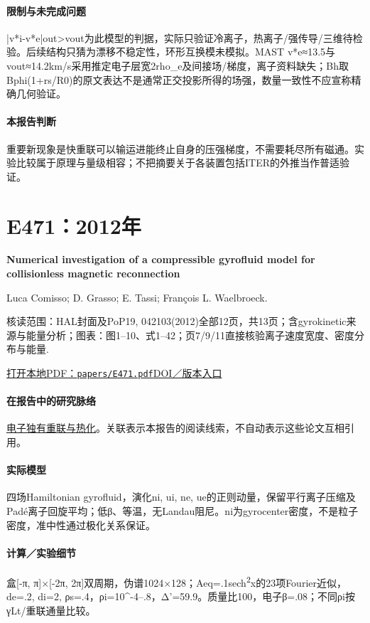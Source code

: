 \paragraph{限制与未完成问题}|v*i-v*e|out>vout为此模型的判据，实际只验证冷离子，热离子/强传导/三维待检验。后续结构只猜为漂移不稳定性，环形互换模未模拟。MAST v*e≈13.5与vout≈14.2km/s采用推定电子层宽2rho\_e及间接场/梯度，离子资料缺失；Bh取Bphi(1+rs/R0)的原文表达不是通常正交投影所得的场强，数量一致性不应宣称精确几何验证。

\paragraph{本报告判断}重要新现象是快重联可以输运进能终止自身的压强梯度，不需要耗尽所有磁通。实验比较属于原理与量级相容；不把摘要关于各装置包括ITER的外推当作普适验证。

\section{E471：2012年}\label{paper:E471}

\textbf{Numerical investigation of a compressible gyrofluid model for collisionless magnetic reconnection}\citep{E471}\

Luca Comisso;  D. Grasso;  E. Tassi;  François L. Waelbroeck.

\textsf{核读范围：}HAL封面及PoP19, 042103(2012)全部12页，共13页；含gyrokinetic来源与能量分析；\textsf{图表：}图1–10、式1–42；页7/9/11直接核验离子速度宽度、密度分布与能量.

\href{run:papers/E471.pdf}{打开本地PDF：\texttt{papers/E471.pdf}}\quad\href{https://doi.org/10.1063/1.3697860}{DOI／版本入口}

\paragraph{在报告中的研究脉络}\hyperref[story:energy]{电子独有重联与热化}。关联表示本报告的阅读线索，不自动表示这些论文互相引用。

\paragraph{实际模型}四场Hamiltonian gyrofluid，演化ni, ui, ne, ue的正则动量，保留平行离子压缩及Padé离子回旋平均；低β、等温，无Landau阻尼。ni为gyrocenter密度，不是粒子密度，准中性通过极化关系保证。

\paragraph{计算／实验细节}盒[-π, π]×[-2π, 2π]双周期，伪谱1024×128；Aeq=.1sech\textsuperscript{2}x的23项Fourier近似，de=.2, di=2, ρs=.4，ρi=10\textasciicircum{}-4–.8，Δ'=59.9。质量比100，电子β=.08；不同ρi按γLt/重联通量比较。

